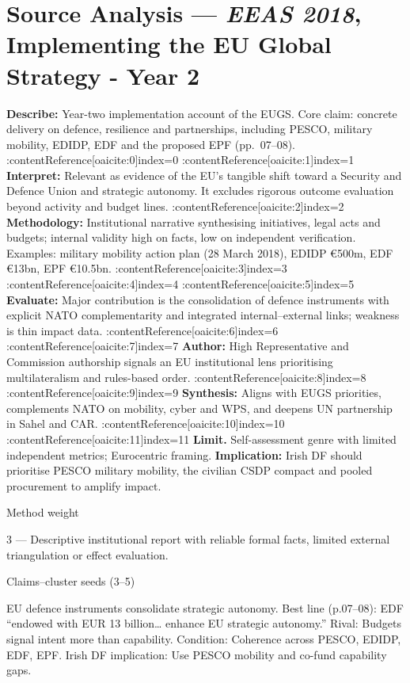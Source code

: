 \section*{Source Analysis — \textit{EEAS 2018}, Implementing the EU Global Strategy - Year 2}
\textbf{Describe:} Year-two implementation account of the EUGS. Core claim: concrete delivery on defence, resilience and partnerships, including PESCO, military mobility, EDIDP, EDF and the proposed EPF (pp.~07–08). :contentReference[oaicite:0]{index=0} :contentReference[oaicite:1]{index=1}
\textbf{Interpret:} Relevant as evidence of the EU’s tangible shift toward a Security and Defence Union and strategic autonomy. It excludes rigorous outcome evaluation beyond activity and budget lines. :contentReference[oaicite:2]{index=2}
\textbf{Methodology:} Institutional narrative synthesising initiatives, legal acts and budgets; internal validity high on facts, low on independent verification. Examples: military mobility action plan (28 March 2018), EDIDP €500m, EDF €13bn, EPF €10.5bn. :contentReference[oaicite:3]{index=3} :contentReference[oaicite:4]{index=4} :contentReference[oaicite:5]{index=5}
\textbf{Evaluate:} Major contribution is the consolidation of defence instruments with explicit NATO complementarity and integrated internal–external links; weakness is thin impact data. :contentReference[oaicite:6]{index=6} :contentReference[oaicite:7]{index=7}
\textbf{Author:} High Representative and Commission authorship signals an EU institutional lens prioritising multilateralism and rules-based order. :contentReference[oaicite:8]{index=8} :contentReference[oaicite:9]{index=9}
\textbf{Synthesis:} Aligns with EUGS priorities, complements NATO on mobility, cyber and WPS, and deepens UN partnership in Sahel and CAR. :contentReference[oaicite:10]{index=10} :contentReference[oaicite:11]{index=11}
\textbf{Limit.} Self-assessment genre with limited independent metrics; Eurocentric framing. 
\textbf{Implication:} Irish DF should prioritise PESCO military mobility, the civilian CSDP compact and pooled procurement to amplify impact.

Method weight

3 — Descriptive institutional report with reliable formal facts, limited external triangulation or effect evaluation.

Claims–cluster seeds (3–5)

EU defence instruments consolidate strategic autonomy.
Best line (p.07–08): EDF “endowed with EUR 13 billion… enhance EU strategic autonomy.”
Rival: Budgets signal intent more than capability.
Condition: Coherence across PESCO, EDIDP, EDF, EPF.
Irish DF implication: Use PESCO mobility and co-fund capability gaps.

